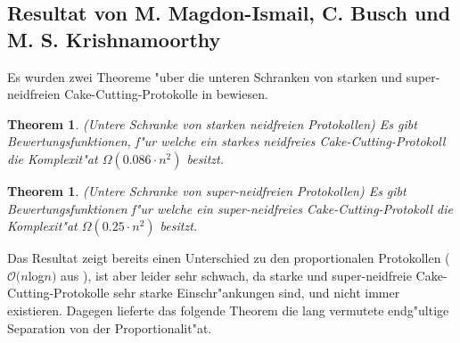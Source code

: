 \documentclass[11pt, a4paper, twoside]{article}
\newtheorem{thm}[satz]{Theorem}
\numberwithin{equation}{section}
\begin{document}
\subsection{Resultat von M. Magdon-Ismail, C. Busch und\\M. S. Krishnamoorthy}
Es wurden zwei Theoreme "uber die unteren Schranken von starken und super-neidfreien Cake-Cutting-Protokolle in \cite{6} bewiesen.
\begin{thm}(Untere Schranke von starken neidfreien Protokollen)
\newline Es gibt Bewertungsfunktionen, f"ur welche ein starkes neidfreies Cake-Cutting-Protokoll die Komplexit"at $\Omega(0.086\cdot n^2)$ besitzt.
\end{thm}
\begin{thm}(Untere Schranke von super-neidfreien Protokollen)
\newline Es gibt Bewertungsfunktionen f"ur welche ein super-neidfreies Cake-Cutting-Protokoll die Komplexit"at $\Omega(0.25\cdot n^2)$ besitzt.
\end{thm}
Das Resultat zeigt bereits einen Unterschied zu den proportionalen Protokollen ($\mathcal{O}(n$log$ n)$ aus \cite{3}), ist aber leider sehr schwach, da starke und super-neidfreie Cake-Cutting-Protokolle sehr starke Einschr"ankungen sind, und nicht immer existieren. Dagegen lieferte das folgende Theorem die lang vermutete endg"ultige Separation von der Proportionalit"at.
\end{document}
